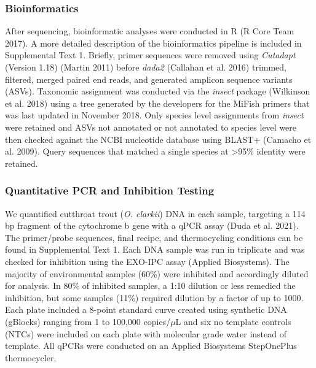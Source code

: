 \documentclass[
]{article}
\begin{document}
\hypertarget{bioinformatics}{%
\subsubsection{Bioinformatics}\label{bioinformatics}}

After sequencing, bioinformatic analyses were conducted in R (R Core
Team 2017). A more detailed description of the bioinformatics pipeline
is included in Supplemental Text 1. Briefly, primer sequences were
removed using \emph{Cutadapt} (Version 1.18) (Martin 2011) before
\emph{dada2} (Callahan et al. 2016) trimmed, filtered, merged paired end
reads, and generated amplicon sequence variants (ASVs). Taxonomic
assignment was conducted via the \emph{insect} package (Wilkinson et al.
2018) using a tree generated by the developers for the MiFish primers
that was last updated in November 2018. Only species level assignments
from \emph{insect} were retained and ASVs not annotated or not annotated
to species level were then checked against the NCBI nucleotide database
using BLAST+ (Camacho et al. 2009). Query sequences that matched a
single species at \textgreater95\% identity were retained.

\hypertarget{quantitative-pcr-and-inhibition-testing}{%
\subsubsection{Quantitative PCR and Inhibition
Testing}\label{quantitative-pcr-and-inhibition-testing}}

We quantified cutthroat trout (\emph{O. clarkii}) DNA in each sample,
targeting a 114 bp fragment of the cytochrome b gene with a qPCR assay
(Duda et al. 2021). The primer/probe sequences, final recipe, and
thermocycling conditions can be found in Supplemental Text 1. Each DNA
sample was run in triplicate and was checked for inhibition using the
EXO-IPC assay (Applied Biosystems). The majority of environmental
samples (60\%) were inhibited and accordingly diluted for analysis. In
80\% of inhibited samples, a 1:10 dilution or less remedied the
inhibition, but some samples (11\%) required dilution by a factor of up
to 1000. Each plate included a 8-point standard curve created using
synthetic DNA (gBlocks) ranging from 1 to 100,000 copies/\(\mu\)L and
six no template controls (NTCs) were included on each plate with
molecular grade water instead of template. All qPCRs were conducted on
an Applied Biosystems StepOnePlus thermocycler.
\end{document}
